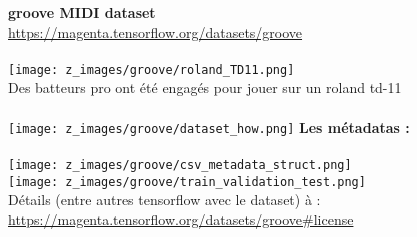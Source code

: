 \textbf{groove MIDI dataset}\\
	\url{https://magenta.tensorflow.org/datasets/groove}\\\\
	\texttt{[image: z\_images/groove/roland\_TD11.png]}\\
	Des batteurs pro ont été engagés pour jouer sur un roland td-11\\\\
	\texttt{[image: z\_images/groove/dataset\_how.png]}\newpage{}
	\textbf{Les métadatas :}\\\\
	\texttt{[image: z\_images/groove/csv\_metadata\_struct.png]}\\
	\texttt{[image: z\_images/groove/train\_validation\_test.png]}\\
	Détails (entre autres tensorflow avec le dataset) à :
	\url{https://magenta.tensorflow.org/datasets/groove#license}\\
	\newpage